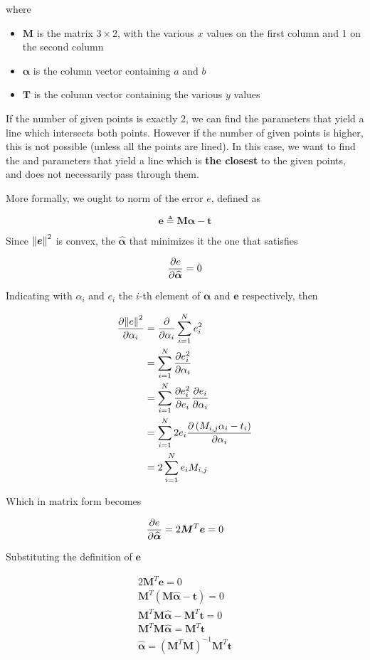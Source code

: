 \documentclass[oneside,onecolumn]{report}
\begin{document}
where
\begin{itemize}
    \item $\bm M$ is the matrix $3\times2$, with the various $x$ values on the first column and 1 on the second column
    \item $\bm \alpha$ is the column vector containing $a$ and $b$
    \item $\bm T$ is the column vector containing the various $y$ values
\end{itemize}

If the number of  given points is exactly 2, we can find the parameters that yield a line which intersects both points. However if the number of given points is higher, this is not possible (unless all the points are lined). In this case, we want to find the and parameters that yield a line which is \textbf{the closest} to the given points, and does not necessarily pass through them.

More formally, we ought to norm of the error $e$, defined as

$$ \bm e \triangleq \bm M \bm \alpha - \bm t $$

Since $\norm{\bm e}^2$ is convex, the $\bm{\widehat \alpha}$ that minimizes it the one that satisfies

$$ \pdv{e}{\bm{\widehat \alpha}} = 0 $$

Indicating with $\alpha_i$ and $e_i$ the $i$-th element of $\bm \alpha$ and $\bm e$ respectively, then

\begin{align*}
    \pdv{\norm{e}^2}{\alpha_i}
    &= \pdv{}{\alpha_i} \sum_{i = 1}^N e_i^2 \\
    &= \sum_{i = 1}^N \pdv{e_i^2}{\alpha_i} \\
    &= \sum_{i = 1}^N \pdv{e_i^2}{e_i} \pdv{e_i}{\alpha_i} \\
    &= \sum_{i = 1}^N 2 e_i \pdv{\left(M_{i,j} \alpha_i - t_i\right)}{\alpha_i}  \\
    &= 2 \sum_{i = 1}^N e_i M_{i, j}
\end{align*}

Which in matrix form becomes

$$ \pdv{e}{\bm{\widehat \alpha}} = 2 \bm M^T \bm e = 0 $$

Substituting the definition of $\bm e$

\begin{gather*}
    2 \bm M^T \bm e = 0 \\
    \bm M^T (\bm M \bm{\widehat \alpha} - \bm t) = 0 \\
    \bm M^T \bm M \bm{\widehat \alpha} - \bm M^T \bm t = 0 \\
    \bm M^T \bm M \bm{\widehat \alpha} = \bm M^T \bm t \\
    \bm{\widehat \alpha} = \left(\bm M^T \bm M \right)^{-1} \bm M^T \bm t
\end{gather*}
\end{document}

